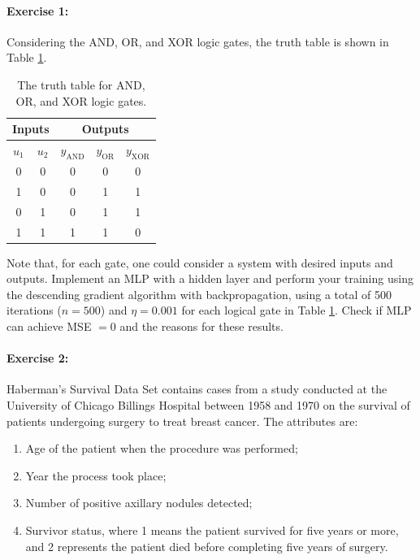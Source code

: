 \paragraph{\textbf{Exercise 1:}} Considering the AND, OR, and XOR logic gates, the truth table is shown in Table \ref{tab:verdade}.

\begin{table}[h!]
\caption{The truth table for AND, OR, and XOR logic gates.}
\label{tab:verdade}
\begin{center}
\begin{tabular}{cc|ccc}
\hline
\multicolumn{2}{c|}{Inputs} & \multicolumn{3}{c}{Outputs}                                  \\ \hline
$u_1$         & $u_2$        & $y_{\textrm{AND}}$ & $y_{\textrm{OR}}$ & $y_{\textrm{XOR}}$ \\ \hline
0             & 0            & 0                  & 0                 & 0                  \\
1             & 0            & 0                  & 1                 & 1                  \\
0             & 1            & 0                  & 1                 & 1                  \\
1             & 1            & 1                  & 1                 & 0                 \\ \hline
\end{tabular}
\end{center}
\end{table}

Note that, for each gate, one could consider a system with desired inputs and outputs. Implement an MLP with a hidden layer and perform your training using the descending gradient algorithm with backpropagation, using a total of 500 iterations ($n = 500$) and $\eta = 0.001$ for each logical gate in Table \ref{tab:verdade}. Check if MLP can achieve MSE $ = 0$ and the reasons for these results.

\paragraph{\textbf{Exercise 2:}} Haberman's Survival Data Set contains cases from a study conducted at the University of Chicago Billings Hospital between 1958 and 1970 on the survival of patients undergoing surgery to treat breast cancer. The attributes are:
\begin{enumerate}
    \item Age of the patient when the procedure was performed;
	\item Year the process took place;
	\item Number of positive axillary nodules detected;
	\item Survivor status, where 1 means the patient survived for five years or more, and 2 represents the patient died before completing five years of surgery.
\end{enumerate}

